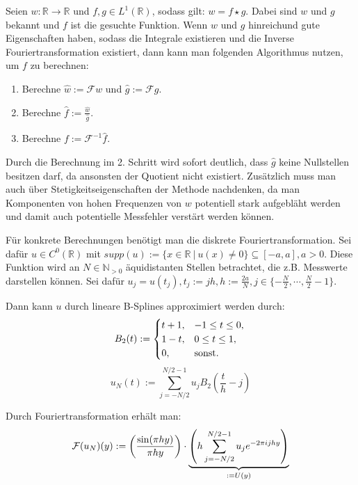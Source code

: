\documentclass{article}
\newcommand{\R}[0]{\mathbb{R}}
\begin{document}
Seien $w: \R \to \R$ und $f, g \in L^1(\R)$, sodass gilt: $w = f \star g$. Dabei sind $w$ und $g$ bekannt und $f$ ist die gesuchte Funktion.
Wenn $w$ und $g$ hinreichund gute Eigenschaften haben, sodass die Integrale existieren und die Inverse Fouriertransformation existiert, dann kann
man folgenden Algorithmus nutzen, um $f$ zu berechnen:
\begin{enumerate}
    \item Berechne $\hat{w} := \mathcal{F}w$ und $\hat{g} := \mathcal{F}g$.
    \item Berechne $\hat{f} := \frac{\hat{w}}{\hat{g}}$.
    \item Berechne $f := \mathcal{F}^{-1}\hat{f}$.
\end{enumerate}

Durch die Berechnung im 2. Schritt wird sofort deutlich, dass $\hat{g}$ keine Nullstellen besitzen darf,
da ansonsten der Quotient nicht existiert. Zusätzlich muss man auch über Stetigkeitseigenschaften der Methode nachdenken,
da man Komponenten von hohen Frequenzen von $w$ potentiell stark aufgebläht werden 
und damit auch potentielle Messfehler verstärt werden können.

Für konkrete Berechnungen benötigt man die diskrete Fouriertransformation. 
Sei dafür $u \in C^0(\R)$ mit $supp(u) := \{x \in \R \: | \: u(x) \neq 0 \} \subseteq [-a, a], a > 0$. Diese Funktion wird an $N \in \mathbb{N}_{>0}$ äquidistanten Stellen betrachtet, 
die z.B. Messwerte darstellen können. Sei dafür $u_j = u(t_j), t_j := jh, h:= \frac{2a}{N}, j \in \{-\frac{N}{2}, \cdots, \frac{N}{2} - 1\}$.

Dann kann $u$ durch lineare B-Splines approximiert werden durch:
\begin{equation}
    B_2(t) := \begin{cases}
        t + 1, &-1 \leq t \leq 0, \\
        1 - t, &0 \leq t \leq 1, \\
        0, &{\rm sonst}.
    \end{cases} \\
\end{equation}
\begin{equation}
    u_N(t) := \sum\limits_{j=-N/2}^{N/2-1} u_j B_2 \left(\frac{t}{h} - j\right)
\end{equation}

Durch Fouriertransformation erhält man:
\begin{equation}
    \mathcal{F}(u_N)(y) := \left(\frac{{\rm sin}(\pi h y)}{\pi h y}\right) \cdot \underbrace{\left(h \sum\limits_{j=-N/2}^{N/2-1} u_j e^{-2\pi i jhy}\right)}_{:=U(y)}
\end{equation}
\end{document}
